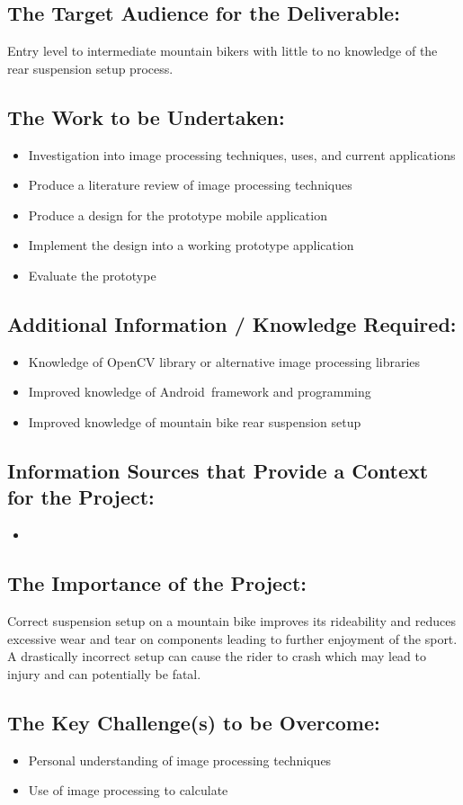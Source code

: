 \documentclass[a4paper, 12pt]{article}
\begin{document}
	\subsection[Audience]{The Target Audience for the Deliverable:}
	Entry level to intermediate mountain bikers with little to no knowledge of the rear suspension setup process.
	
	\subsection[Work]{The Work to be Undertaken:}
	\begin{itemize}
		\item Investigation into image processing techniques, uses, and current applications
		\item Produce a literature review of image processing techniques
		\item Produce a design for the prototype mobile application
		\item Implement the design into a working prototype application
		\item Evaluate the prototype
	\end{itemize}
	
	\subsection[Additional Info]{Additional Information / Knowledge Required:}
	\begin{itemize}
		\item Knowledge of OpenCV library or alternative image processing libraries
		\item Improved knowledge of Android\texttrademark\ framework and programming
		\item Improved knowledge of mountain bike rear suspension setup
	\end{itemize}
	
	\subsection[Sources]{Information Sources that Provide a Context for the Project:}
	\begin{itemize}
		\item 
	\end{itemize}
	
	\subsection[Importance]{The Importance of the Project:}
	Correct suspension setup on a mountain bike improves its rideability and reduces excessive wear and tear on components leading to further enjoyment of the sport. A drastically incorrect setup can cause the rider to crash which may lead to injury and can potentially be fatal.
	
	\subsection[Challenges]{The Key Challenge(s) to be Overcome:}
	\begin{itemize}
		\item Personal understanding of image processing techniques
		\item Use of image processing to calculate 
	\end{itemize}
\end{document}
